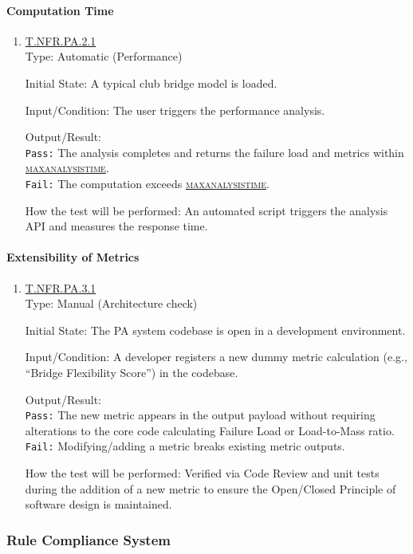 \documentclass[12pt, titlepage]{article}
\newcommand{\testdef}[1]{\leavevmode\hypertarget{test:#1}{}\hyperlink{trace:#1}{#1}}
\DeclareRobustCommand{\cname}[1]{{\renewcommand{\_}{\textunderscore\allowbreak}\textsc{#1}}}
\newcommand{\constfirst}[1]{\leavevmode\hypertarget{constfirst:\detokenize{#1}}{}\hyperlink{const:\detokenize{#1}}{\cname{#1}}}
\newcommand{\const}[1]{\hyperlink{const:\detokenize{#1}}{\cname{#1}}}
\begin{document}
\paragraph{Computation Time}
\begin{enumerate}
  \item \testdef{T.NFR.PA.2.1}\\
  Type: Automatic (Performance)

  Initial State: A typical club bridge model is loaded.

  Input/Condition: The user triggers the performance analysis.

  Output/Result: \\
  \texttt{Pass:} The analysis completes and returns the failure load and metrics within \constfirst{max\_analysis\_time}.\\
  \texttt{Fail:} The computation exceeds \const{max\_analysis\_time}.

  How the test will be performed: An automated script triggers the analysis API and measures the response time.
\end{enumerate}

\paragraph{Extensibility of Metrics}
\begin{enumerate}
  \item \testdef{T.NFR.PA.3.1}\\
  Type: Manual (Architecture check)

  Initial State: The PA system codebase is open in a development environment.

  Input/Condition: A developer registers a new dummy metric calculation (e.g., ``Bridge Flexibility Score'') in the codebase.

  Output/Result: \\
  \texttt{Pass:} The new metric appears in the output payload without requiring alterations to the core code calculating Failure Load or Load-to-Mass ratio.\\
  \texttt{Fail:} Modifying/adding a metric breaks existing metric outputs.

  How the test will be performed: Verified via Code Review and unit tests during the addition of a new metric to ensure the Open/Closed Principle of software design is maintained.
\end{enumerate}


\subsubsection{Rule Compliance System}
\end{document}
